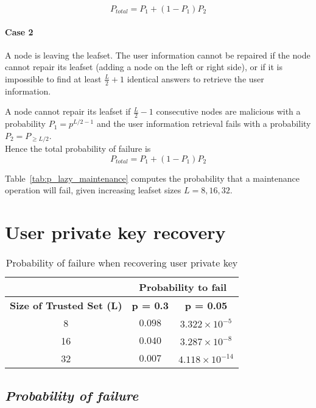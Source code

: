 $$
  P_{total} = P_1 + (1-P_1) P_2
$$


    \paragraph{\textbf{Case 2}} A node is leaving the leafset. The user
information cannot be repaired if the node cannot repair its leafset (adding a
node on the left or right side), or if it is impossible to find at least
$\frac{L}{2} +1$ identical answers to retrieve the user information.

A node cannot repair its leafset if $\frac{L}{2} -1$ consecutive nodes are
malicious with a probability $P_1 = p^{L/2 - 1}$ and the user information
retrieval fails with a probability $P_2 = P_{\ge L/2}$.\\
Hence the total probability of failure is
$$
  P_{total} = P_1 + (1-P_1)P_2
$$

Table~\ref{tab:p_lazy_maintenance} computes the probability that a maintenance
operation will fail, given increasing leafset sizes $L = {8,16,32}$.


\section{User private key recovery}
\label{sec:eval_private_key_recovery}
  \begin{table}
    \centering
    \footnotesize
    \begin{tabular}{|c|c|c|}
      \cline{2-3}
      \multicolumn{1}{c|}{}&  \multicolumn{2}{c|}{\textbf{Probability to fail}} \\ \cline{2-3}
      \hline
      \textbf{Size of Trusted Set (L)} & \textbf{p = 0.3} & \textbf{p = 0.05} \\
      \hline \hline
      8 &  $0.098$ & $3.322 \times 10^{-5}$ \\
      \hline
      16 & $0.040$ & $3.287 \times 10^{-8}$  \\
      \hline
      32 & $0.007$ & $4.118 \times 10^{-14}$  \\
      \hline
    \end{tabular}
    \caption{Probability of failure when recovering user private key}
    \label{tab:p_private_key_recovery}
  \end{table}

  \subsection{\textit{Probability of failure}}

